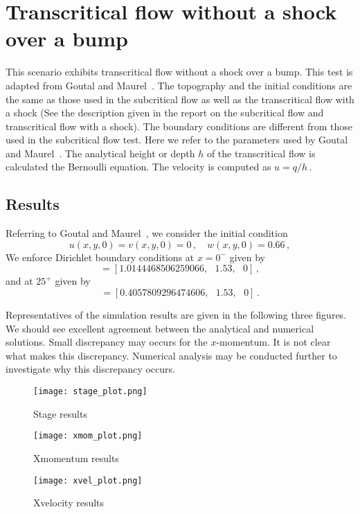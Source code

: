 
\section{Transcritical flow without a shock over a bump}

This scenario exhibits transcritical flow without a shock over a bump.
This test is adapted from Goutal and Maurel~\cite{GM1997}.
The topography and the initial conditions are the same as those used in the subcritical flow as well as the transcritical flow with a shock (See the description given in the report on the subcritical flow and transcritical flow with a shock). The boundary conditions are different from those used in the subcritical flow test. Here we refer to the parameters used by Goutal and Maurel~\cite{GM1997}. The analytical height or depth $h$ of the transcritical flow is calculated the Bernoulli equation. The velocity is computed as $u=q/h$\,.

\subsection{Results}
Referring to Goutal and Maurel~\cite{GM1997}, we consider the initial condition
\begin{equation}
u(x,y,0)=v(x,y,0)=0\,, \quad
w(x,y,0)= 0.66\,,
\end{equation}
We enforce Dirichlet boundary conditions
at $x=0^{-}$ given by
\begin{equation}
[w,hu,hv]=[1.0144468506259066,~~~1.53,~~~0]\,,
\end{equation}
and at $25^{+}$ given by
\begin{equation}
[w,hu,hv]=[0.4057809296474606,~~~1.53,~~~0]\,.
\end{equation}




Representatives of the simulation results are given in the following three figures. We should see excellent agreement between the analytical and numerical solutions. Small discrepancy may occurs for the $x$-momentum. It is not clear what makes this discrepancy. Numerical analysis may be conducted further to investigate why this discrepancy occurs.

\begin{figure}
\begin{center}
\texttt{[image: stage\_plot.png]}
\end{center}
\caption{Stage results}
\end{figure}


\begin{figure}
\begin{center}
\texttt{[image: xmom\_plot.png]}
\end{center}
\caption{Xmomentum results}
\end{figure}


\begin{figure}
\begin{center}
\texttt{[image: xvel\_plot.png]}
\end{center}
\caption{Xvelocity results}
\end{figure}


\endinput
